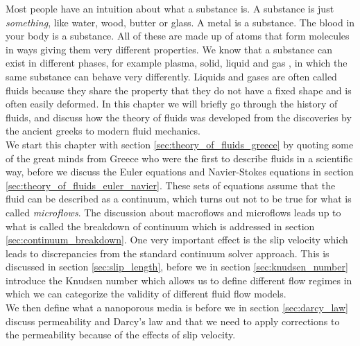Most people have an intuition about what a substance is. A substance is just \textit{something}, like water, wood, butter or glass. A metal is a substance. The blood in your body is a substance. All of these are made up of atoms that form molecules in ways giving them very different properties. We know that a substance can exist in different phases, for example plasma, solid, liquid and gas \cite{ravndal2008statmech}, in which the same substance can behave very differently. Liquids and gases are often called fluids because they share the property that they do not have a fixed shape and is often easily deformed. In this chapter we will briefly go through the history of fluids, and discuss how the theory of fluids was developed from the discoveries by the ancient greeks to modern fluid mechanics. \\
We start this chapter with section \ref{sec:theory_of_fluids_greece} by quoting some of the great minds from Greece who were the first to describe fluids in a scientific way, before we discuss the Euler equations and Navier-Stokes equations in section \ref{sec:theory_of_fluids_euler_navier}. These sets of equations assume that the fluid can be described as a continuum, which turns out not to be true for what is called \textit{microflows}. The discussion about macroflows and microflows leads up to what is called the breakdown of continuum which is addressed in section \ref{sec:continuum_breakdown}. One very important effect is the slip velocity which leads to discrepancies from the standard continuum solver approach. This is discussed in section \ref{sec:slip_length}, before we in section \ref{sec:knudsen_number} introduce the Knudsen number which allows us to define different flow regimes in which we can categorize the validity of different fluid flow models.\\
We then define what a nanoporous media is before we in section \ref{sec:darcy_law} discuss permeability and Darcy's law and that we need to apply corrections to the permeability because of the effects of slip velocity.
